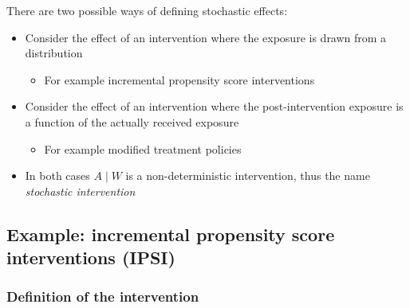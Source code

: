 \documentclass[
  12pt,
]{book}
\providecommand{\tightlist}{%
  \setlength{\itemsep}{0pt}\setlength{\parskip}{0pt}}
\theoremstyle{definition}
\theoremstyle{definition}
\theoremstyle{definition}
\newcommand{\1}{\mathbbm{1}}
\begin{document}
There are two possible ways of defining stochastic effects:

\begin{itemize}
\tightlist
\item
  Consider the effect of an intervention where the exposure is drawn from a
  distribution

  \begin{itemize}
  \tightlist
  \item
    For example incremental propensity score interventions
  \end{itemize}
\end{itemize}

\begin{itemize}
\tightlist
\item
  Consider the effect of an intervention where the post-intervention exposure is
  a function of the actually received exposure

  \begin{itemize}
  \tightlist
  \item
    For example modified treatment policies
  \end{itemize}
\item
  In both cases \(A \mid W\) is a non-deterministic intervention, thus the name
  \emph{stochastic intervention}
\end{itemize}

\hypertarget{ipsi}{%
\subsection{\texorpdfstring{Example: incremental propensity score interventions (IPSI) \citep{kennedy2018nonparametric}}{Example: incremental propensity score interventions (IPSI) {[}@kennedy2018nonparametric{]}}}\label{ipsi}}

\hypertarget{definition-of-the-intervention}{%
\subsubsection*{Definition of the intervention}\label{definition-of-the-intervention}}
\end{document}
